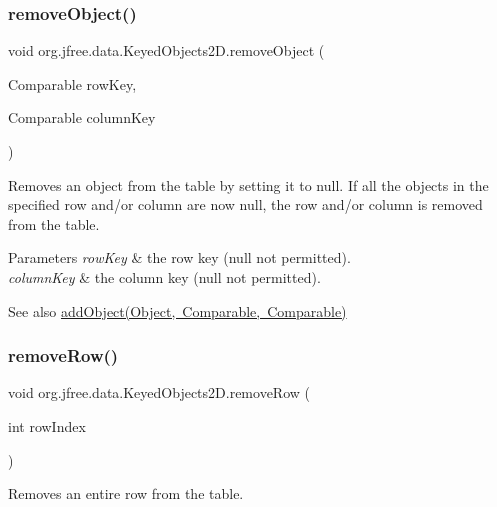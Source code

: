 \subsubsection{\texorpdfstring{remove\+Object()}{removeObject()}}
{\footnotesize\ttfamily void org.\+jfree.\+data.\+Keyed\+Objects2\+D.\+remove\+Object (\begin{DoxyParamCaption}\item[{Comparable}]{row\+Key,  }\item[{Comparable}]{column\+Key }\end{DoxyParamCaption})}

Removes an object from the table by setting it to {\ttfamily null}. If all the objects in the specified row and/or column are now {\ttfamily null}, the row and/or column is removed from the table.


\begin{DoxyParams}{Parameters}
{\em row\+Key} & the row key ({\ttfamily null} not permitted). \\
\hline
{\em column\+Key} & the column key ({\ttfamily null} not permitted).\\
\hline
\end{DoxyParams}
\begin{DoxySeeAlso}{See also}
\mbox{\hyperlink{classorg_1_1jfree_1_1data_1_1_keyed_objects2_d_afa172de81029721b22c1ee5bbde4240d}{add\+Object(\+Object, Comparable, Comparable)}} 
\end{DoxySeeAlso}
\mbox{\label{classorg_1_1jfree_1_1data_1_1_keyed_objects2_d_a402d4db2a4f3d6b95654e80e8c374bb3}} 
\subsubsection{\texorpdfstring{remove\+Row()}{removeRow()}\hspace{0.1cm}{\footnotesize\ttfamily [1/2]}}
{\footnotesize\ttfamily void org.\+jfree.\+data.\+Keyed\+Objects2\+D.\+remove\+Row (\begin{DoxyParamCaption}\item[{int}]{row\+Index }\end{DoxyParamCaption})}

Removes an entire row from the table.


